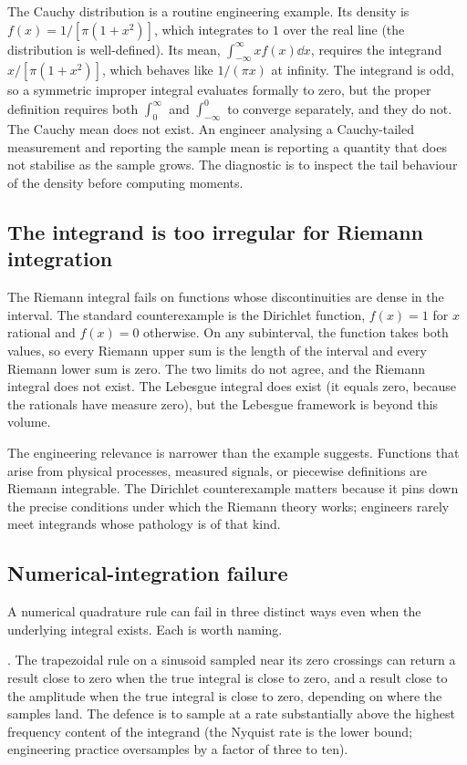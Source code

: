 The Cauchy distribution is a routine engineering example. Its
density is $f(x) = 1/[\pi(1 + x^{2})]$, which integrates to $1$
over the real line (the distribution is well-defined). Its mean,
$\int_{-\infty}^{\infty} x f(x) \dd x$, requires the integrand
$x/[\pi(1 + x^{2})]$, which behaves like $1/(\pi x)$ at infinity.
The integrand is odd, so a symmetric improper integral evaluates
formally to zero, but the proper definition requires both
$\int_{0}^{\infty}$ and $\int_{-\infty}^{0}$ to converge separately,
and they do not. The Cauchy mean does not exist. An engineer
analysing a Cauchy-tailed measurement and reporting the sample
mean is reporting a quantity that does not stabilise as the sample
grows. The diagnostic is to inspect the tail behaviour of the
density before computing moments.

\subsection{The integrand is too irregular for Riemann integration}

The Riemann integral fails on functions whose discontinuities are
dense in the interval. The standard counterexample is the
Dirichlet function, $f(x) = 1$ for $x$ rational and $f(x) = 0$
otherwise. On any subinterval, the function takes both values, so
every Riemann upper sum is the length of the interval and every
Riemann lower sum is zero. The two limits do not agree, and the
Riemann integral does not exist. The Lebesgue integral does exist
(it equals zero, because the rationals have measure zero), but the
Lebesgue framework is beyond this volume.

The engineering relevance is narrower than the example suggests.
Functions that arise from physical processes, measured signals, or
piecewise definitions are Riemann integrable. The Dirichlet
counterexample matters because it pins down the precise conditions
under which the Riemann theory works; engineers rarely meet
integrands whose pathology is of that kind.

\subsection{Numerical-integration failure}

A numerical quadrature rule can fail in three distinct ways even
when the underlying integral exists. Each is worth naming.

. The trapezoidal rule on a sinusoid sampled near
its zero crossings can return a result close to zero when the
true integral is close to zero, and a result close to the
amplitude when the true integral is close to zero, depending on
where the samples land. The defence is to sample at a rate
substantially above the highest frequency content of the integrand
(the Nyquist rate is the lower bound; engineering practice
oversamples by a factor of three to ten).

